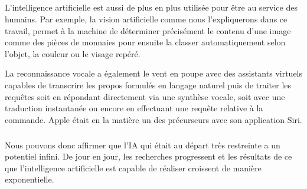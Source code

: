 \subparagraph{}
L’intelligence artificielle est aussi de plus en plus utilisée pour être au service des humains. Par exemple, la vision artificielle comme nous l’expliquerons dans ce travail, permet à la machine de déterminer précisément le contenu d'une image comme des pièces de monnaies pour ensuite la classer automatiquement selon l'objet, la couleur ou le visage repéré. 

La reconnaissance vocale a également le vent en poupe avec des assistants virtuels capables de transcrire les propos formulés en langage naturel puis de traiter les requêtes soit en répondant directement via une synthèse vocale, soit avec une traduction instantanée ou encore en effectuant une requête relative à la commande. Apple était en la matière un des précurseurs avec son application Siri.

\subparagraph{}
Nous pouvons donc affirmer que l’IA qui était au départ très restreinte a un potentiel infini. 
De jour en jour, les recherches progressent et les résultats de ce que l’intelligence artificielle est capable de réaliser croissent de manière exponentielle.




